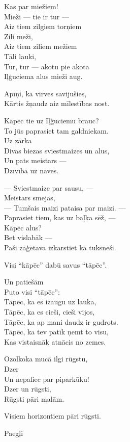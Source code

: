\documentclass[14pt]{extarticle}
\begin{document}
Kas par miežiem!\\
Mieži --- tie ir tur ---\\
Aiz tiem zilgiem torņiem\\
Zili meži,\\
Aiz tiem ziliem mežiem\\
Tāli lauki,\\
Tur, tur --- akotu pie akota\\
Iļģuciema alus mieži aug.

Apīņi, kā virves savijušies,\\
Kārtis žņaudz aiz mīlestības nost.

Kāpēc tie uz Iļģuciemu brauc?\\
To jūs paprasiet tam galdniekam.\\
Uz zārka\\
Divas biezas sviestmaizes un alus,\\
Un pats meistars ---\\
Dzīvība uz nāves.

--- Sviestmaize par sausu, ---\\
Meistars smejas,\\
--- Tumšais maizi pataisa par maizi. ---\\
Paprasiet tiem, kas uz baļķa sēž, ---\\
Kāpēc alus?\\
Bet vislabāk ---\\
Paši zāģētavā izkarstiet kā tuksneši.

Visi ``kāpēc'' dabū savus ``tāpēc''.

Un patiešām\\
Puto visi ``tāpēc'':\\
Tāpēc, ka es izaugu uz lauka,\\
Tāpēc, ka es cieši, cieši vijos,\\
Tāpēc, ka ap mani daudz ir gudrots.\\
Tāpēc, ka tev patīk ņemt to visu,\\
Kas vistaisnāk atnācis no zemes.

Ozolkoka mucā ilgi rūgstu,\\
Dzer\\
Un nepaliec par piparkūku!\\
Dzer un rūgsti,\\
Rūgsti pāri malām.

Visiem horizontiem pāri rūgsti.



\newpage

{\large \sc Paegļi}
\end{document}
